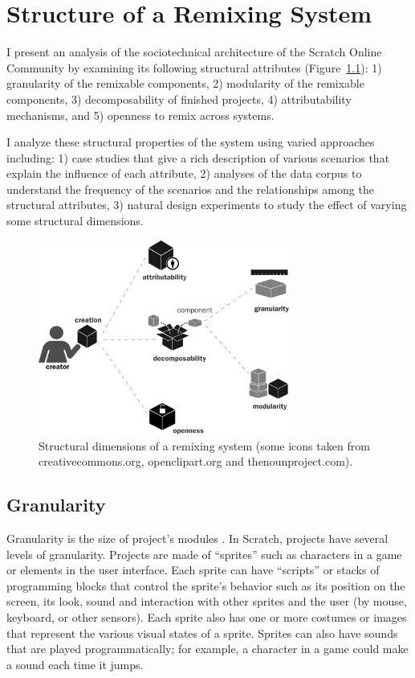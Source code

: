 \chapter{Structure of a Remixing System} 
I present an analysis of the sociotechnical architecture of the Scratch Online Community by examining its following structural attributes (Figure~\ref{fig:structure}):
1) granularity of the remixable components, 
2) modularity of the remixable components, 
3) decomposability of finished projects, 
4) attributability mechanisms, and 
5) openness to remix across systems.

I analyze these structural properties of the system using varied approaches including:
1) case studies that give a rich description of various scenarios that explain the influence of each attribute,
2) analyses of the data corpus to understand the frequency of the scenarios and the relationships among the structural attributes,
3) natural design experiments to study the effect of varying some structural dimensions.

\begin{figure} 
\centering
\includegraphics[width=3.25in]{figures/structure.pdf}
\caption{Structural dimensions of a remixing system (some icons taken from creativecommons.org, openclipart.org and thenounproject.com).}
\label{fig:structure}
\end{figure}

\section{Granularity}
Granularity is the size of project's modules \citep{benkler_coases_2002}. 
In Scratch, projects have several levels of granularity.
Projects are made of ``sprites'' such as characters in a game or elements in the user interface.
Each sprite can have ``scripts'' or stacks of programming blocks that control the sprite's behavior such as its position on the screen, its look, sound and interaction with other sprites and the user (by mouse, keyboard, or other sensors).
Each sprite also has one or more costumes or images that represent the various visual states of a sprite.
Sprites can also have sounds that are played programmatically; for example, a character in a game could make a sound each time it jumps.

